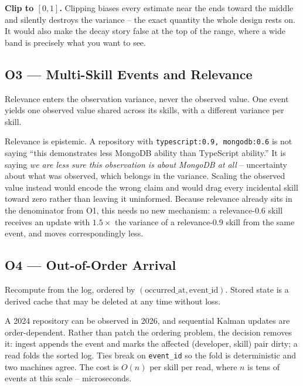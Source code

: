 \documentclass[10pt,a4paper]{article}
\newenvironment{decidedbox}[1]{%
  \def\FrameCommand{{\color{accent}\vrule width 2.4pt}\hspace{9pt}}%
  \MakeFramed{\advance\hsize-\width \FrameRestore}%
  \noindent{\sffamily\footnotesize\bfseries\color{accent}DECIDED --- #1}\par\smallskip
  \small
}{%
  \par\endMakeFramed
}
\newenvironment{rejectedbox}{%
  \def\FrameCommand{{\color{open}\vrule width 2.4pt}\hspace{9pt}}%
  \MakeFramed{\advance\hsize-\width \FrameRestore}%
  \noindent{\sffamily\footnotesize\bfseries\color{open}REJECTED ALTERNATIVE}\par\smallskip
  \small
}{%
  \par\endMakeFramed
}
\begin{document}
\begin{rejectedbox}
\textbf{Clip to $[0,1]$.} Clipping biases every estimate near the ends
toward the middle and silently destroys the variance -- the exact quantity
the whole design rests on. It would also make the decay story false at the
top of the range, where a wide band is precisely what you want to see.
\end{rejectedbox}

\subsection{O3 --- Multi-Skill Events and Relevance}

\begin{decidedbox}{}
Relevance enters the observation variance, never the observed value. One
event yields one observed value shared across its skills, with a different
variance per skill.
\end{decidedbox}

Relevance is epistemic. A repository with \texttt{typescript:0.9,
mongodb:0.6} is not saying ``this demonstrates less MongoDB ability than
TypeScript ability.'' It is saying \emph{we are less sure this observation
is about MongoDB at all} -- uncertainty about what was observed, which
belongs in the variance. Scaling the observed value instead would encode the
wrong claim and would drag every incidental skill toward zero rather than
leaving it uninformed. Because relevance already sits in the denominator
from O1, this needs no new mechanism: a relevance-0.6 skill receives an
update with $1.5\times$ the variance of a relevance-0.9 skill from the same
event, and moves correspondingly less.

\subsection{O4 --- Out-of-Order Arrival}

\begin{decidedbox}{}
Recompute from the log, ordered by $(\text{occurred\_at}, \text{event\_id})$.
Stored state is a derived cache that may be deleted at any time without loss.
\end{decidedbox}

A 2024 repository can be observed in 2026, and sequential Kalman updates are
order-dependent. Rather than patch the ordering problem, the decision
removes it: ingest appends the event and marks the affected
(developer, skill) pair dirty; a read folds the sorted log. Ties break on
\texttt{event\_id} so the fold is deterministic and two machines agree. The
cost is $O(n)$ per skill per read, where $n$ is tens of events at this
scale -- microseconds.
\end{document}
